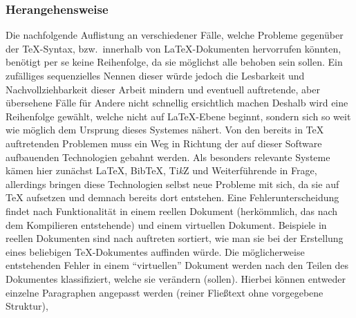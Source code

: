 \subsubsection*{Herangehensweise}
Die nachfolgende Auflistung an verschiedener Fälle, welche Probleme gegenüber der \TeX{}-Syntax, bzw.\ innerhalb von \LaTeX{}-Dokumenten hervorrufen könnten, benötigt per se keine Reihenfolge, da sie möglichst alle behoben sein sollen. Ein zufälliges sequenzielles Nennen dieser würde jedoch die Lesbarkeit und Nachvollziehbarkeit dieser Arbeit mindern und eventuell auftretende, aber übersehene Fälle für Andere nicht schnellig ersichtlich machen
Deshalb wird eine Reihenfolge gewählt, welche nicht auf \LaTeX{}-Ebene beginnt, sondern sich so weit wie möglich dem Ursprung dieses Systemes nähert. Von den bereits in \TeX{} auftretenden Problemen muss ein Weg in Richtung der auf dieser Software aufbauenden Technologien gebahnt werden. Als besonders relevante Systeme kämen hier zunächst \LaTeX{}, Bib\TeX{}, Ti\textit{k}Z und Weiterführende in Frage, allerdings bringen diese Technologien selbst neue Probleme mit sich, da sie auf \TeX{} aufsetzen und demnach bereits dort entstehen. 
Eine Fehlerunterscheidung findet nach Funktionalität in einem reellen Dokument (herkömmlich, das nach dem Kompilieren entstehende) und einem virtuellen Dokument. 
Beispiele in reellen Dokumenten sind nach auftreten sortiert, wie man sie bei der Erstellung eines beliebigen \TeX{}-Dokumentes auffinden würde.
% 
Die möglicherweise entstehenden Fehler in einem \enquote{virtuellen} Dokument werden nach den Teilen des Dokumentes klassifiziert, welche sie verändern (sollen). Hierbei können entweder einzelne Paragraphen angepasst werden (reiner Fließtext ohne vorgegebene Struktur),%
